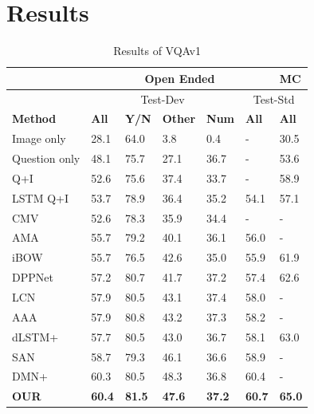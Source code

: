 \section{Results}

\begin{table}[H]
\centering
{}
\caption{Results of VQAv1}
\label{my-label}
\begin{tabular}{|l|l|l|l|l|l| l|}
\hline
  & \multicolumn{5}{|c|}{Open Ended}  & MC  \\
  \hline
 & \multicolumn{4}{|c|}{Test-Dev}  & \multicolumn{2}{|c|}{Test-Std} \\
\hline


\textbf{Method} & \textbf{All}  &\textbf{ Y/N}  & \textbf{Other}  & \textbf{Num} & \textbf{All} & \textbf{All}  \\ \hline \hline
Image only& 28.1& 64.0& 3.8& 0.4& - & 30.5\\ \hline
Question only& 48.1& 75.7& 27.1& 36.7& - & 53.6\\ \hline
Q+I& 52.6& 75.6& 37.4& 33.7& - & 58.9\\ \hline
LSTM Q+I& 53.7& 78.9& 36.4& 35.2& 54.1 & 57.1\\ \hline
CMV \cite{jiang2015compositional} & 52.6& 78.3& 35.9& 34.4& - & -\\ \hline 
AMA \cite{wu2015ask} & 55.7& 79.2& 40.1& 36.1& 56.0 & -\\ \hline
iBOW \cite{zhou2015simple} & 55.7& 76.5& 42.6& 35.0& 55.9 & 61.9\\ \hline
DPPNet \cite{noh2015image}& 57.2& 80.7& 41.7& 37.2& 57.4 & 62.6\\ \hline
LCN \cite{andreas2016learning} & 57.9& 80.5& 43.1& 37.4& 58.0 & -\\ \hline
AAA \cite{xu2015ask} & 57.9& 80.8& 43.2& 37.3& 58.2 & -\\ \hline
dLSTM+ \cite{Lu2015} & 57.7& 80.5& 43.0& 36.7& 58.1 & 63.0\\ \hline
SAN \cite{yang2015stacked} & 58.7& 79.3& 46.1& 36.6& 58.9 & -\\ \hline
DMN+ \cite{xiong2016dynamic} & 60.3& 80.5& 48.3& 36.8& 60.4 & -\\ \hline
\textbf{OUR} & \textbf{60.4}& \textbf{81.5}& \textbf{47.6}& \textbf{37.2}& \textbf{60.7} & \textbf{65.0} \\ \hline

\end{tabular}
\end{table}
